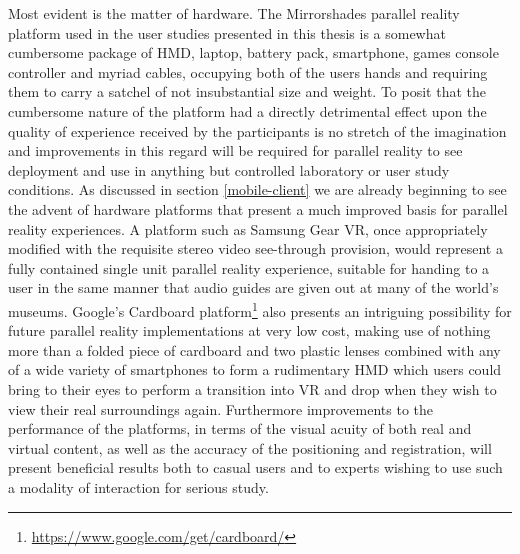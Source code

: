 Most evident is the matter of hardware. The Mirrorshades parallel reality platform used in the user studies presented in this thesis is a somewhat cumbersome package of HMD, laptop, battery pack, smartphone, games console controller and myriad cables, occupying both of the users hands and requiring them to carry a satchel of not insubstantial size and weight. To posit that the cumbersome nature of the platform had a directly detrimental effect upon the quality of experience received by the participants is no stretch of the imagination and improvements in this regard will be required for parallel reality to see deployment and use in anything but controlled laboratory or user study conditions. As discussed in section \ref{mobile-client} we are already beginning to see the advent of hardware platforms that present a much improved basis for parallel reality experiences. A platform such as Samsung Gear VR, once appropriately modified with the requisite stereo video see-through provision, would represent a fully contained single unit parallel reality experience, suitable for handing to a user in the same manner that audio guides are given out at many of the world's museums. Google's Cardboard platform\footnote{\url{https://www.google.com/get/cardboard/}} also presents an intriguing possibility for future parallel reality implementations at very low cost, making use of nothing more than a folded piece of cardboard and two plastic lenses combined with any of a wide variety of smartphones to form a rudimentary HMD which users could bring to their eyes to perform a transition into VR and drop when they wish to view their real surroundings again. Furthermore improvements to the performance of the platforms, in terms of the visual acuity of both real and virtual content, as well as the accuracy of the positioning and registration, will present beneficial results both to casual users and to experts wishing to use such a modality of interaction for serious study. 

